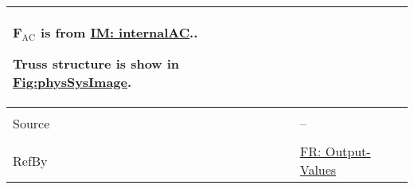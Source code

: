\documentclass[12pt]{article}
\begin{document}
\begin{minipage}{\textwidth}
\begin{tabular}{>{\raggedright}p{}>{\raggedright\arraybackslash}p{}}
        ${\mathbf{F}_{\text{AC}}}$ is from \hyperref[IM:internalAC]{IM: internalAC}..
        
        Truss structure is show in \hyperref[Figure:physSysImage]{Fig:physSysImage}.
        
\\ \midrule \\
Source & --
         
\\ \midrule \\
RefBy & \hyperref[outputValues]{FR: Output-Values}
        
\\ \bottomrule
\end{tabular}
\end{minipage}

\vspace{\baselineskip}
\noindent
\end{document}
